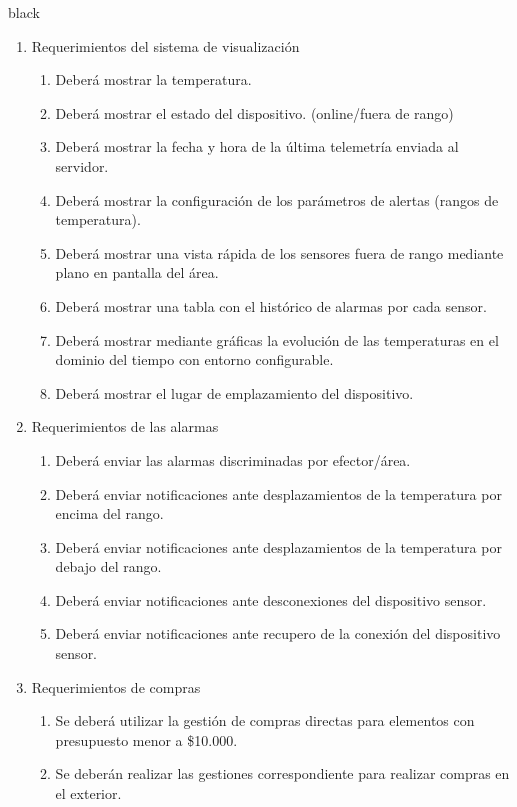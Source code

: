 \documentclass[11pt]{charter}
\begin{document}
\begin{consigna}{black}
\begin{enumerate}
\item Requerimientos del sistema de visualización
    \begin{enumerate}
	\item Deberá mostrar la temperatura.
	\item Deberá mostrar el estado del dispositivo. (online/fuera de rango)
	\item Deberá mostrar la fecha y hora de la última telemetría enviada al servidor.
	\item Deberá mostrar la configuración de los parámetros de alertas (rangos de temperatura).
	\item Deberá mostrar una vista rápida de los sensores fuera de rango mediante plano en pantalla del área.
	\item Deberá mostrar una tabla con el histórico de alarmas por cada sensor.
    \item Deberá mostrar mediante gráficas la evolución de las temperaturas en el dominio del tiempo con entorno configurable.
    \item Deberá mostrar el lugar de emplazamiento del dispositivo.
	\end{enumerate}	
    

\item Requerimientos de las alarmas
	\begin{enumerate}
	\item Deberá enviar las alarmas discriminadas por efector/área.
	\item Deberá enviar notificaciones ante desplazamientos de la temperatura por encima del rango.
	\item Deberá enviar notificaciones ante desplazamientos de la temperatura por debajo del rango.
	\item Deberá enviar notificaciones ante desconexiones del dispositivo sensor.
	\item Deberá enviar notificaciones ante recupero de la conexión del dispositivo sensor.
	 \end{enumerate}	 

\item Requerimientos de compras
	\begin{enumerate}
	\item Se deberá utilizar la gestión de compras directas para elementos con presupuesto menor a {\$10.000}.
	\item Se deberán realizar las gestiones correspondiente para realizar compras en el exterior.
	\end{enumerate}
	
		
\end{enumerate}


\end{consigna}
\end{document}

